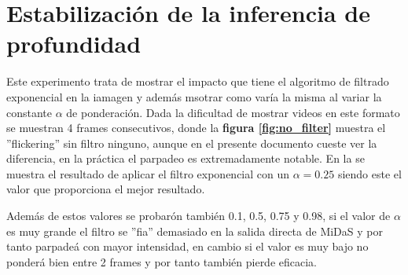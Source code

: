     \section{Estabilización de la inferencia de profundidad}
Este experimento trata de mostrar el impacto que tiene el algoritmo de filtrado exponencial en la iamagen y además msotrar como varía la misma al variar la constante $\alpha$ de ponderación. Dada la dificultad de mostrar videos en este formato se muestran 4 frames consecutivos, donde la \textbf{figura \ref{fig:no_filter}} muestra el ''flickering'' sin filtro ninguno, aunque en el presente documento cueste ver la diferencia, en la práctica el parpadeo es extremadamente notable. En la  se muestra el resultado de aplicar el filtro exponencial con un $\alpha = 0.25$ siendo este el valor que proporciona el mejor resultado.

Además de estos valores se probarón también 0.1, 0.5, 0.75 y 0.98, si el valor de $\alpha$ es muy grande el filtro se ''fia'' demasiado en la salida directa de MiDaS y por tanto parpadeá con mayor intensidad, en cambio si el valor es muy bajo no ponderá bien entre 2 frames y por tanto también pierde eficacia.

